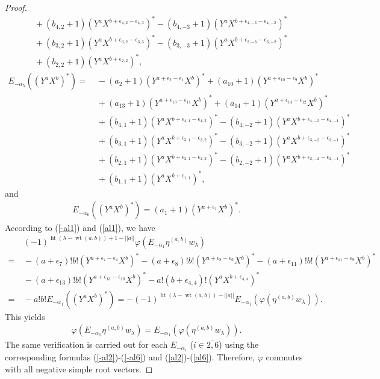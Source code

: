 \documentclass[12pt]{article}
\numberwithin{equation}{section}
\theoremstyle{definition}
\theoremstyle{remark}
\begin{document}
\begin{proof}
\begin{align}
		&\:+(b_{4,2}+1)(Y^aX^{b+\epsilon_{4,2}-\epsilon_{4,3}})^*-(b_{4,-3}+1)(Y^aX^{b+\epsilon_{4,-3}-\epsilon_{4,-2}})^*\nonumber\\
		&\:+(b_{3,2}+1)(Y^aX^{b+\epsilon_{3,2}-\epsilon_{3,3}})^*-(b_{3,-3}+1)(Y^aX^{b+\epsilon_{3,-3}-\epsilon_{3,-2}})^*\nonumber\\
		&\:+(b_{2,2}+1)(Y^aX^{b+\epsilon_{2,2}})^*,
	\end{align}
	\begin{align}
		E_{-\alpha_5}((Y^aX^b)^*)\nonumber=&\:-(a_2+1)(Y^{a+\epsilon_2-\epsilon_1}X^{b})^*+(a_{10}+1)(Y^{a+\epsilon_{10}-\epsilon_9}X^{b})^*\nonumber\\
		&\:+(a_{13}+1)(Y^{a+\epsilon_{13}-\epsilon_{11}}X^{b})^*+(a_{14}+1)(Y^{a+\epsilon_{14}-\epsilon_{12}}X^{b})^*\nonumber\\
		&\:+(b_{4,1}+1)(Y^aX^{b+\epsilon_{4,1}-\epsilon_{4,2}})^*-(b_{4,-2}+1)(Y^aX^{b+\epsilon_{4,-2}-\epsilon_{4,-1}})^*\nonumber\\
		&\:+(b_{3,1}+1)(Y^aX^{b+\epsilon_{3,1}-\epsilon_{3,2}})^*-(b_{3,-2}+1)(Y^aX^{b+\epsilon_{3,-2}-\epsilon_{3,-1}})^*\nonumber\\
		&\:+(b_{2,1}+1)(Y^aX^{b+\epsilon_{2,1}-\epsilon_{2,2}})^*-(b_{2,-2}+1)(Y^aX^{b+\epsilon_{2,-2}-\epsilon_{2,-1}})^*\nonumber\\
		&\:+(b_{1,1}+1)(Y^aX^{b+\epsilon_{1,1}})^*,
	\end{align}
	and
	\begin{eqnarray}
		E_{-\alpha_6}((Y^aX^b)^*)=(a_1+1)(Y^{a+\epsilon_1}X^b)^*. \label{al6}
	\end{eqnarray}
	According to (\ref{-al1}) and (\ref{al1}), we have
	\begin{align}
		&\:(-1)^{\operatorname{ht}(\lambda-\operatorname{wt}(a,b))+1-||a||}\varphi(E_{-\alpha_1}\eta^{(a,b)}w_{\lambda})\nonumber\\
		=&\:-(a+\epsilon_7)!b!(Y^{a+\epsilon_7-\epsilon_4}X^{b})^*-(a+\epsilon_8)!b!(Y^{a+\epsilon_8-\epsilon_6}X^b)^*-(a+\epsilon_{11})!b!(Y^{a+\epsilon_{11}-\epsilon_9}X^{b})^*\nonumber\\
		&\:-(a+\epsilon_{13})!b!(Y^{a+\epsilon_{13}-\epsilon_{10}}X^{b})^*-a!(b+\epsilon_{4,4})!(Y^{a}X^{b+\epsilon_{4,4}})^*\nonumber\\
		=&\:-a!b!E_{-\alpha_1}((Y^aX^b)^*)=-(-1)^{\operatorname{ht}(\lambda-\operatorname{wt}(a,b))-||a||}E_{-\alpha_1}(\varphi(\eta^{(a,b)}w_{\lambda})).
	\end{align}
	This yields
	\begin{align}
		\varphi(E_{-\alpha_1}\eta^{(a,b)}w_{\lambda})=E_{-\alpha_1}(\varphi(\eta^{(a,b)}w_{\lambda})).
	\end{align}
	The same verification is carried out for each $E_{-\alpha_i}$ ($i\in\overline{2,6}$) using the corresponding formulas (\ref{-al2})-(\ref{-al6}) and (\ref{al2})-(\ref{al6}). Therefore, $\varphi$ commutes with all negative simple root vectors.
	

\end{proof}
\end{document}

